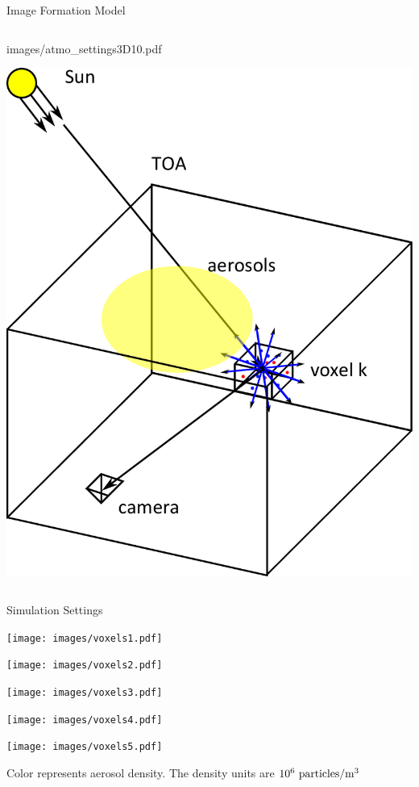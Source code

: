 \documentclass[compress,red,12pt]{beamer}
\begin{document}
\begin{frame}[label=current]{Image Formation Model}
\begin{columns}[c]
\begin{overprint}
{{          {images/atmo_settings3D10.pdf}}}
       {\centerline{\includegraphics[width=\columnwidth]
          {images/atmo_settings3D11.pdf}}}
    \end{overprint}

  \end{columns}
\end{frame}


\begin{frame}[label=settings]{Simulation Settings}
  \begin{center}
    \begin{overlayarea}{\columnwidth}{8cm}
        {\centerline{\texttt{[image: images/voxels1.pdf]}}}
        {\centerline{\texttt{[image: images/voxels2.pdf]}}}
        {\centerline{\texttt{[image: images/voxels3.pdf]}}}
        {
          \hfill\hyperlink{air-density}{}  
          \centerline{\texttt{[image: images/voxels4.pdf]}}
        }
        {
          \hfill\hyperlink{typical-concentrations}{}  
          \centerline{\texttt{[image: images/voxels5.pdf]}}
          \begin{center}
            \tiny{Color represents aerosol density. The density units are $10^{6}~{\rm particles}/{\rm m}^3$}
          \end{center}
        }
    \end{overlayarea}
  \end{center}
\end{frame}
\end{document}
